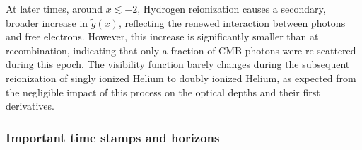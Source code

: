\documentclass{aa}
\numberwithin{equation}{section}
\numberwithin{table}{section}
\numberwithin{figure}{section}
\begin{document}
At later times, around $x \lesssim -2$, Hydrogen reionization causes a secondary, broader increase in $\tilde{g}(x)$, reflecting the renewed interaction between photons and free electrons. However, this increase is significantly smaller than at recombination, indicating that only a fraction of CMB photons were re-scattered during this epoch. The visibility function barely changes during the subsequent reionization of singly ionized Helium to doubly ionized Helium, as expected from the negligible impact of this process on the optical depths and their first derivatives.



\subsubsection{Important time stamps and horizons}
\end{document}
